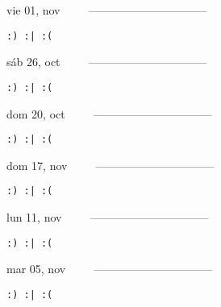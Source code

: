 \documentclass[letterpaper,10pt]{article}
\begin{document}
\begin{multicols}{3}
{vie 01, nov\ \ \ \ \ --------------------------------}
\begin{flushright}\begin{small}\texttt{:) :| :(}\end{small}\end{flushright}
\vfill
{sáb 26, oct\ \ \ \ \ --------------------------------}
\begin{flushright}\begin{small}\texttt{:) :| :(}\end{small}\end{flushright}\par
\vfill
{dom 20, oct\ \ \ \ \ --------------------------------}
\begin{flushright}\begin{small}\texttt{:) :| :(}\end{small}\end{flushright}\par
\vfill
\end{multicols}
\vspace{1.05cm}

\begin{multicols}{3}
{dom 17, nov\ \ \ \ \ --------------------------------}
\begin{flushright}\begin{small}\texttt{:) :| :(}\end{small}\end{flushright}
\vfill
{lun 11, nov\ \ \ \ \ --------------------------------}
\begin{flushright}\begin{small}\texttt{:) :| :(}\end{small}\end{flushright}\par
\vfill
{mar 05, nov\ \ \ \ \ --------------------------------}
\begin{flushright}\begin{small}\texttt{:) :| :(}\end{small}\end{flushright}\par
\vfill
\end{multicols}
\vspace{1.05cm}
\end{document}
